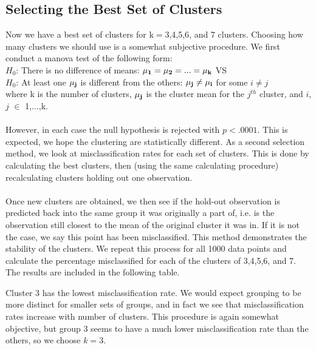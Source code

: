 \documentclass[11pt]{article}
\begin{document}
\subsection*{Selecting the Best Set of Clusters}
Now we have a best set of clusters for k$=$3,4,5,6, and 7 clusters. Choosing how many clusters we should use is a somewhat subjective procedure. We first conduct a manova test of the following form: 
\\
\indent $H_0$: There is no difference of means: $\bf{\mu}_{1} = \bf{\mu}_{2} = ... = \bf{\mu}_{k}$ VS 
\\
\indent $H_0$: At least one $\bf{\mu}_{j}$ is different from the others: $\bf{\mu}_{j} \ne \bf{\mu}_{i}$ for some $i \ne j$
\\
where k is the number of clusters, $\bf{\mu}_{j}$ is the cluster mean for the $j^{th}$ cluster, and $i$, $j$ $\in$ 1,...,k.
\\
\\ 
However, in each case the null hypothesis is rejected with $p<.0001$. This is expected, we hope the clustering are statistically different. As a second selection method, we look at misclassification rates for each set of clusters. This is done by calculating the best clusters, then (using the same calculating procedure) recalculating clusters holding out one observation. 
\\
\\
Once new clusters are obtained, we then see if the hold-out observation is predicted back into the same group it was originally a part of, i.e. is the observation still closest to the mean of the original cluster it was in. If it is not the case, we say this point has been misclassified. This method demonstrates the stability of the clusters. We repeat this process for all 1000 data points and calculate the percentage misclassified for each of the clusters of 3,4,5,6, and 7. The results are included in the following table.


\noindent Cluster 3 has the lowest misclassification rate. We would expect grouping to be more distinct for smaller sets of groups, and in fact we see that misclassification rates increase with number of clusters. This procedure is again somewhat objective, but group 3 seems to have a much lower misclassification rate than the others, so we choose $k=3$.
\end{document}
